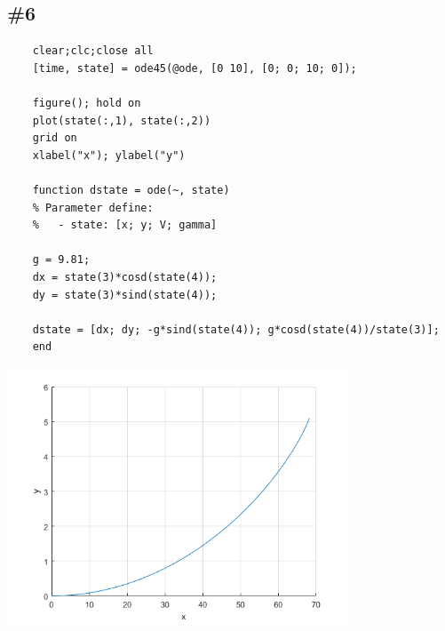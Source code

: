 \documentclass[12pt]{article}
\begin{document}



\subsection*{\#6}

\begin{verbatim}
    clear;clc;close all
    [time, state] = ode45(@ode, [0 10], [0; 0; 10; 0]);

    figure(); hold on
    plot(state(:,1), state(:,2))
    grid on
    xlabel("x"); ylabel("y")

    function dstate = ode(~, state)
    % Parameter define:
    %   - state: [x; y; V; gamma]

    g = 9.81;
    dx = state(3)*cosd(state(4));
    dy = state(3)*sind(state(4));

    dstate = [dx; dy; -g*sind(state(4)); g*cosd(state(4))/state(3)];
    end
\end{verbatim}

\centering
\includegraphics [width=4in]{HW5_01.png}
\end{document}
